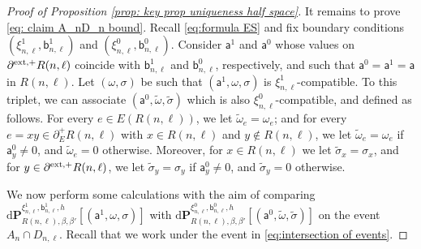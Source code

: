 \documentclass[11pt,a4paper]{article}
\numberwithin{equation}{section}
\theoremstyle{plain}
\theoremstyle{definition}
\begin{document}
\begin{proof}[Proof of Proposition \textup{\ref{prop: key prop uniqueness half space}}]
It remains to prove \eqref{eq: claim A_nD_n bound}. Recall \eqref{eq:formula ES} and fix boundary conditions $(\xi^1_{n,\ell}, \mathsf b^1_{n,\ell})$ and $(\xi^0_{n,\ell}, \mathsf b^0_{n,\ell})$. Consider $\mathsf{a}^1$ and $\mathsf{a}^0$ whose values on $\partial^{\textup{ext},+}R(n,\ell)$ coincide with $\mathsf{b}^1_{n,\ell}$ and $\mathsf{b}^0_{n,\ell}$, respectively, and such that $\mathsf a^0=\mathsf a^1=\mathsf{a}$ in $R(n,\ell)$. Let $(\omega,\sigma)$ be such that $(\mathsf{a}^1,\omega,\sigma)$ is $\xi^1_{n,\ell}$-compatible. To this triplet, we can associate $(\mathsf{a}^0,\tilde \omega,\tilde \sigma)$ which is also $\xi^0_{n,\ell}$-compatible, and defined as follows. For every $e\in E(R(n,\ell))$, we let $\tilde \omega_e=\omega_e$; and for every $e=xy\in \partial^{+}_E R(n,\ell)$ with $x\in R(n,\ell)$ and $y\notin R(n,\ell)$, we let $\tilde \omega_e=\omega_e$ if $\mathsf{a}^0_y\neq 0$, and $\tilde \omega_e=0$ otherwise. Moreover, for $x\in {R}(n,\ell)$ we let
$\tilde\sigma_x=\sigma_x$, and for $y\in \partial^{\textup{ext},+}R(n,\ell)$, we let $\tilde \sigma_y=\sigma_y$ if $\mathsf{a}^0_y\neq 0$, and $\tilde \sigma_y=0$ otherwise.

We now perform some calculations with the aim of comparing $\mathrm{d}\mathbf P^{\xi^1_{n,\ell},\mathsf b^1_{n,\ell}, h}_{R(n,\ell), \beta,\beta'}[(\mathsf{a}^1,\omega,\sigma)]$ with $\mathrm{d}\mathbf P^{\xi^0_{n,\ell},\mathsf b^0_{n,\ell}, h}_{R(n,\ell), \beta,\beta'}[(\mathsf{a}^0,\tilde\omega,\tilde\sigma)]$ on the event $A_n\cap D_{n,\ell}$. Recall that we work under the event in \eqref{eq:intersection of events}. 


\end{proof}
\end{document}
